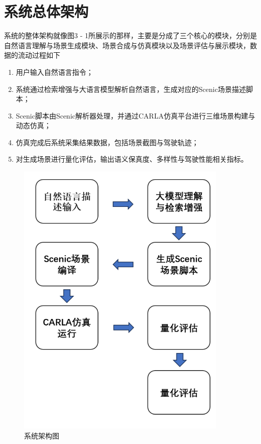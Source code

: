 \section{系统总体架构}
系统的整体架构就像图3 - 1所展示的那样，主要是分成了三个核心的模块，分别是自然语言理解与场景生成模块、场景合成与仿真模块以及场景评估与展示模块，数据的流动过程如下
\begin{enumerate}
	\item 用户输入自然语言指令；
	\item 系统通过检索增强与大语言模型解析自然语言，生成对应的Scenic场景描述脚本；
	\item Scenic脚本由Scenic解析器处理，并通过CARLA仿真平台进行三维场景构建与动态仿真；
	\item 仿真完成后系统采集结果数据，包括场景截图与驾驶轨迹；
	\item 对生成场景进行量化评估，输出语义保真度、多样性与驾驶性能相关指标。
\end{enumerate}
\begin{figure}[H]
	\centering
	\includegraphics[width=0.9\textwidth]{../images/系统架构图.pdf} 
	\caption{系统架构图}
	\label{fig:system_architecture} %
\end{figure}

